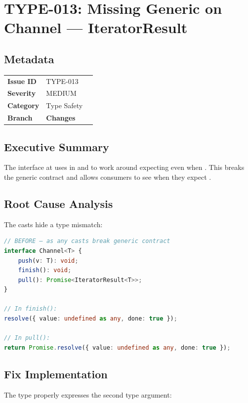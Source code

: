 \section{TYPE-013: Missing Generic on Channel — IteratorResult}
\label{sec:type-013}
\subsection*{Metadata}
\begin{tabular}{ll}
\textbf{Issue ID} & TYPE-013 \\
\textbf{Severity} & MEDIUM \\
\textbf{Category} & Type Safety \\
\textbf{Branch} & 
\textbf{Changes} &  \\
\end{tabular}

\subsection*{Executive Summary}
The  interface at  uses  in  and  to work around  expecting  even when . This breaks the generic contract and allows consumers to see  when they expect .

\subsection*{Root Cause Analysis}
The  casts hide a type mismatch:

\begin{lstlisting}[language=TypeScript]
// BEFORE — as any casts break generic contract
interface Channel<T> {
    push(v: T): void;
    finish(): void;
    pull(): Promise<IteratorResult<T>>;
}

// In finish():
resolve({ value: undefined as any, done: true });

// In pull():
return Promise.resolve({ value: undefined as any, done: true });
\end{lstlisting}

\subsection*{Fix Implementation}
The  type properly expresses the second type argument:

